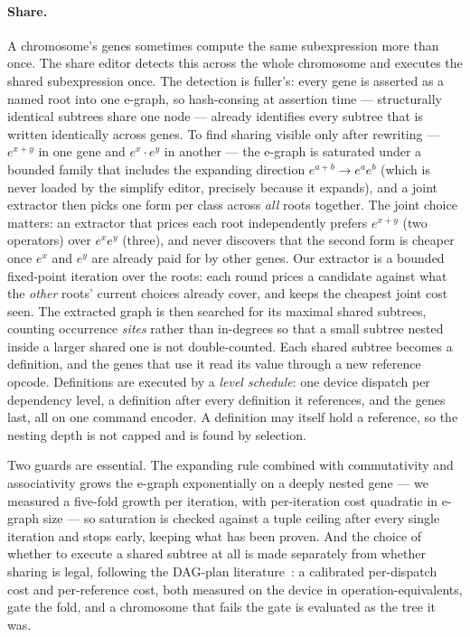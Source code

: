 \documentclass[sigconf,nonacm]{acmart}
\begin{document}
\paragraph{Share.} A chromosome's genes sometimes compute the same subexpression
more than once. The share editor detects this across the whole chromosome and
executes the shared subexpression once. The detection is fuller's: every gene is
asserted as a named root into one e-graph, so hash-consing at assertion time ---
structurally identical subtrees share one node --- already identifies every
subtree that is written identically across genes. To
find sharing visible only after rewriting --- $e^{x+y}$ in one gene and
$e^{x}\cdot e^{y}$ in another --- the e-graph is saturated under a bounded family
that includes the expanding direction $e^{a+b}\to e^{a}e^{b}$ (which is never
loaded by the simplify editor, precisely because it expands), and a joint
extractor then picks one form per class across \emph{all} roots together. The
joint choice matters: an extractor that prices each root independently prefers
$e^{x+y}$ (two operators) over $e^{x}e^{y}$ (three), and never discovers that
the second form is cheaper once $e^{x}$ and $e^{y}$ are already paid for by
other genes. Our extractor is a bounded fixed-point iteration over the roots: each round
prices a candidate against what the \emph{other} roots' current choices already
cover, and keeps the cheapest joint cost seen. The extracted graph is then
searched for its maximal shared subtrees, counting occurrence \emph{sites} rather
than in-degrees so that a small subtree nested inside a larger shared one is not
double-counted. Each shared subtree becomes a definition, and the genes that
use it read its value through a new reference opcode. Definitions are executed
by a \emph{level schedule}: one device dispatch per dependency level, a
definition after every definition it references, and the genes last, all on one
command encoder. A definition may itself hold a reference, so the nesting depth
is not capped and is found by selection.

Two guards are essential. The expanding rule combined with commutativity and
associativity grows the e-graph exponentially on a deeply nested gene --- we
measured a five-fold growth per iteration, with per-iteration cost quadratic in
e-graph size --- so saturation is checked against a tuple ceiling after every
single iteration and stops early, keeping what has been proven. And the choice of
whether to execute a shared subtree at all is made separately from whether
sharing is legal, following the DAG-plan literature~\cite{neumann2009dag}: a
calibrated per-dispatch cost and per-reference cost, both measured on the
device in operation-equivalents, gate the fold, and a chromosome that fails the
gate is evaluated as the tree it was.
\end{document}
